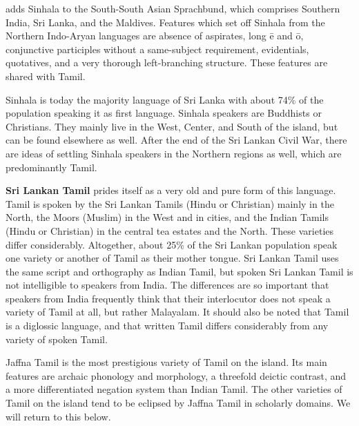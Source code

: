 \documentclass{article}
\begin{document}
\citet{Gair1994ssala,Gair2012xc} adds Sinhala to the South-South Asian Sprachbund, which comprises Southern India, Sri Lanka, and the Maldives. Features which set off Sinhala from the Northern Indo-Aryan languages are absence of aspirates, long \=e and \=o, conjunctive participles without a same-subject requirement, evidentials, quotatives, and a very thorough left-branching structure. These features are shared with Tamil.

Sinhala is today the majority language of Sri Lanka with about 74\% of the population speaking it as first language. Sinhala speakers are Buddhists or Christians. They mainly live in the West, Center, and South of the island, but can be found elsewhere as well. After the end of the Sri Lankan Civil War, there are ideas of settling Sinhala speakers in the Northern regions as well, which are predominantly Tamil.


\textbf{Sri Lankan Tamil} prides itself as a very old and pure form of this language. Tamil is spoken by the Sri Lankan Tamils (Hindu or Christian) mainly in the North, the Moors (Muslim) in the West and in cities, and the Indian Tamils (Hindu or Christian) in the central tea estates and the North. These varieties differ considerably. Altogether, about 25\% of the Sri Lankan population speak one variety or another of Tamil as their mother tongue. 
Sri Lankan Tamil uses the same script and orthography as Indian Tamil, but spoken Sri Lankan Tamil is not intelligible to speakers from India. The differences are so important that speakers from India frequently think that their interlocutor does not speak a variety of Tamil at all, but rather Malayalam. It should also be noted that Tamil is a diglossic language, and that written Tamil differs considerably from any variety of spoken Tamil. 

Jaffna Tamil is the most prestigious variety of Tamil on the island. Its main features are archaic phonology and morphology, a threefold deictic contrast, and a more differentiated negation system than Indian Tamil. The other varieties of Tamil on the island tend to be eclipsed by Jaffna Tamil in scholarly domains. We will return to this below. 
\end{document}
